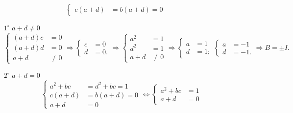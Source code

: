 \documentclass{article}
\begin{document}
\begin{enumerate}
\begin{enumerate}
\[\begin{cases}
                    c(a+d)&=b(a+d)=0
                \end{cases}
            \]
            \begin{enumerate}
                \item [$1^\circ$]$a+d\neq 0$
                \[
                    \begin{cases}
                        (a+d)c&=0\\
                        (a+d)d&=0\\
                        a+d &\neq 0
                    \end{cases}
                    \Rightarrow
                    \begin{cases}
                        c&=0\\
                        d&=0.
                    \end{cases}
                    \Rightarrow
                    \begin{cases}
                        a^2&=1\\
                        d^2&=1\\
                        a+d&\neq 0
                    \end{cases}
                    \Rightarrow
                    \begin{cases}
                        a&=1\\
                        d&=1;
                    \end{cases}
                    \begin{cases}
                        a&=-1\\
                        d&=-1.
                    \end{cases}
                    \Rightarrow
                    B=\pm I.
                \]
                \item [$2^\circ$]$a + d = 0$
                \[
                    \begin{cases}
                        a^2+bc&=d^2+bc=1\\
                        c(a+d)&=b(a+d)=0\\
                        a+d&=0
                    \end{cases}
                    \Leftrightarrow
                    \begin{cases}
                        a^2+bc&=1\\
                        a+d&=0
                    \end{cases}
\]
\end{enumerate}
\end{enumerate}
\end{enumerate}
\end{document}
